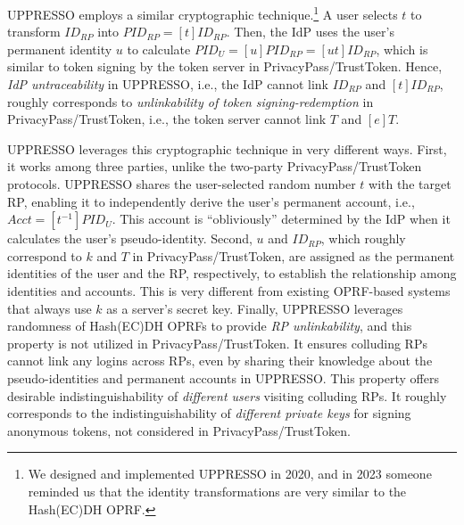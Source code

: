 
UPPRESSO employs a similar cryptographic technique.\footnote{We designed and implemented UPPRESSO in 2020, and in 2023 someone reminded us that the identity transformations are very similar to the Hash(EC)DH OPRF.} 
 A user selects $t$ to transform $ID_{RP}$ into $PID_{RP} = [t]ID_{RP}$.
Then, the IdP uses the user's permanent identity $u$ to calculate $PID_U = [u]PID_{RP} = [ut]ID_{RP}$,
which is similar to token signing by the token server in PrivacyPass/TrustToken.
Hence, \emph{IdP untraceability} in UPPRESSO, i.e., the IdP cannot link $ID_{RP}$ and $[t]ID_{RP}$,
 roughly corresponds to {\em unlinkability of token signing-redemption} in PrivacyPass/TrustToken, i.e., the token server cannot link $T$ and $[e]T$.

UPPRESSO leverages this cryptographic technique in very different ways.
First, 
it works among three parties, unlike the two-party PrivacyPass/TrustToken protocols.
UPPRESSO shares the user-selected random number $t$ with the target RP,
enabling it to independently derive the user's permanent account, i.e., $Acct = [t^{-1}]PID_{U}$. This account is ``obliviously'' determined by the IdP when it calculates the user's pseudo-identity.
Second, $u$ and $ID_{RP}$, which roughly correspond to $k$ and $T$ in PrivacyPass/TrustToken, are assigned as the permanent identities of the user and the RP, respectively, to establish the relationship among identities and accounts.
This is very different from existing OPRF-based systems  \cite{privacypass, trusttoken, strong-oprf, oprf-bitcoin-wallet, pesto, oprf-ot-si, pp-ss, Private-Contact-Discovery, o-kms, oprf-deduplication} that always use $k$ as a server's secret key.
Finally, UPPRESSO leverages randomness of Hash(EC)DH OPRFs to provide \emph{RP unlinkability}, and this property is not utilized in PrivacyPass/TrustToken.
It ensures colluding RPs cannot link any logins across RPs,
even by sharing their knowledge about the pseudo-identities and permanent accounts in UPPRESSO.
This property offers desirable indistinguishability of \emph{different users} visiting colluding RPs.
It roughly corresponds to the indistinguishability of \emph{different private keys} for signing anonymous tokens, not considered in PrivacyPass/TrustToken. 

